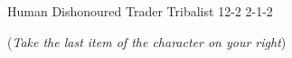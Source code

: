 
\renewcommand\charSpellList{}
\begin{filledCS}%
  {\composeHumanName}%
  {Human}%
  {Dishonoured Trader}%
  {Tribalist}%
  {{1}{2}{-2}}%
  {{2}{-1}{-2}}%
  {%
    \setcounter{Academics}{1}
    \setcounter{Empathy}{1}
    \setcounter{Larceny}{2}
    \setcounter{Vigilance}{1}
    \setcounter{Survival}{1}

    \setcounter{Projectiles}{1}
    \maul
    \partialleather
    \addtocounter{equipmentWeight}{-1}
  }%
  {\adrenalinesurge}%
  {(\textit{Take the last item of the character on your right})}%
  \renewcommand\rank{Fodder}
  \renewcommand\characterDebt{100 \glspl{sp}}

\end{filledCS}

